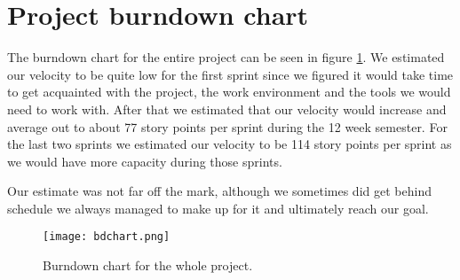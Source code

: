 \section{Project burndown chart}\label{sec:burndown}

The burndown chart for the entire project can be seen in figure \ref{fig:bdchart}. We estimated our velocity to be quite low for the first sprint since we figured it would take time to get acquainted with the project, the work environment and the tools we would need to work with. After that we estimated that our velocity would increase and average out to about 77 story points per sprint during the 12 week semester. For the last two sprints we estimated our velocity to be 114 story points per sprint as we would have more capacity during those sprints. 

Our estimate was not far off the mark, although we sometimes did get behind schedule we always managed to make up for it and ultimately reach our goal. 
	
\begin{figure}[H]
  \centering
  \graphicspath{ {./graphics/} }
  \centerline{\texttt{[image: bdchart.png]}}
  \caption{\label{fig:bdchart} Burndown chart for the whole project.}
\end{figure}
